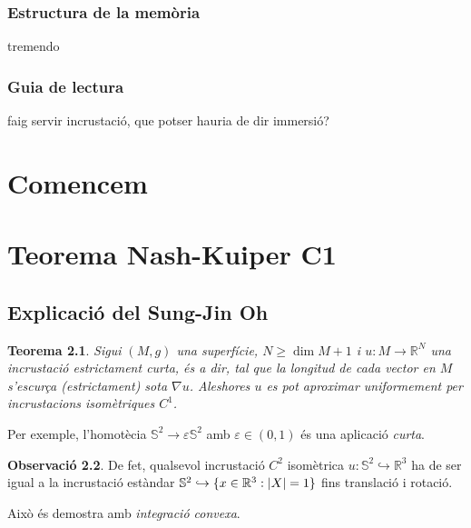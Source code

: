 \documentclass[11pt,a4paper,openright,oneside]{book}
\DeclarePairedDelimiter{\set}{\{}{\}}
\numberwithin{equation}{section}
\newtheorem{teo}{Teorema}[section]
\theoremstyle{definition}
\newtheorem{obs}[teo]{Observaci\'o}
\begin{document}
\subsection*{Estructura de la mem\`oria}
tremendo

\subsection*{Guia de lectura}
faig servir incrustació, que potser hauria de dir immersió?

\newpage

\setcounter{page}{1}

\chapter{Comencem}


\newpage
\chapter{Teorema Nash-Kuiper C1}
\section{Explicació del Sung-Jin Oh}
\begin{teo} Sigui $(M,g)$ una superfície, $N\ge\dim M+1$ i $u:M\to\mathbb R^N$ una incrustació estrictament curta, és a dir, tal que la longitud de cada vector en $M$ s'escurça (estrictament) sota $\nabla u$. Aleshores $u$ es pot aproximar uniformement per incrustacions isomètriques $C^1$.
\end{teo}
Per exemple, l'homotècia $\mathbb S^2\to\varepsilon\mathbb S^2$ amb $\varepsilon\in(0,1)$ és una aplicació \textit{curta}. 
\begin{obs}
De fet, qualsevol incrustació $C^2$ isomètrica $u:\mathbb S^2\hookrightarrow\mathbb R^3$ ha de ser igual a la incrustació estàndar $\mathbb S^2 \hookrightarrow\set{ x\in\mathbb R^3 : |X| = 1 }$ fins translació i rotació. 
\end{obs}
Això és demostra amb \textit{integració convexa}.
\end{document}
